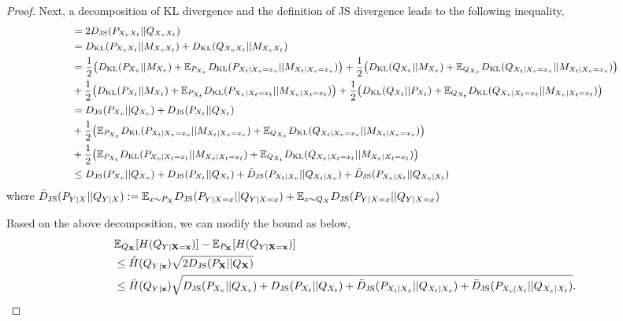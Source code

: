 \begin{proof}
Next, a decomposition of KL divergence and the definition of JS divergence leads to the following inequality,
\begin{equation*}
\small
\begin{split}
&=2 D_{\rm JS}(P_{X_{v}X_{t}}||Q_{X_{v}X_{t}}) \nonumber\\
&= D_{\rm KL}(P_{X_{v}X_{t}}||M_{X_{v}X_{t}}) + D_{\rm KL}(Q_{X_{v}X_{t}}||M_{X_{v}X_{t}}) \nonumber\\
&= \frac{1}{2} \big( D_{\rm KL}(P_{X_{v}}||M_{X_{v}}) + \mathbb{E}_{P_{X_{v}}}D_{\rm KL}(P_{X_{t}|X_{v}=x_{v}} ||M_{X_{t}|X_{v}=x_{v}}) \big) + \frac{1}{2} \big( D_{\rm KL}(Q_{X_{v}}||M_{X_{v}}) + \mathbb{E}_{Q_{X_{v}}}D_{\rm KL}(Q_{X_{t}|X_{v}=x_{v}} ||M_{X_{t}|X_{v}=x_{v}}) \big) \nonumber\\
&+ \frac{1}{2} \big( D_{\rm KL}(P_{X_{t}}||M_{X_{t}}) + \mathbb{E}_{P_{X_{t}}}D_{\rm KL}(P_{X_{v}|X_{t}=x_{t}} ||M_{X_{v}|X_{t}=x_{t}}) \big) + \frac{1}{2} \big( D_{\rm KL}(Q_{X_{t}}||P_{X_{t}}) + \mathbb{E}_{Q_{X_{t}}}D_{\rm KL}(Q_{X_{v}|X_{t}=x_{t}} ||M_{X_{v}|X_{t}=x_{t}}) \big) \nonumber\\
&= D_{\rm JS}(P_{X_{v}}||Q_{X_{v}}) + D_{\rm JS}(P_{X_{t}}||Q_{X_{t}}) \nonumber\\
&+ \frac{1}{2} \big( \mathbb{E}_{P_{X_{v}}}D_{\rm KL}(P_{X_{t}|X_{v}=x_{v}}||M_{X_{t}|X_{v}=x_{v}}) + \mathbb{E}_{Q_{X_{v}}}D_{\rm KL}(Q_{X_{t}|X_{v}=x_{v}}||M_{X_{t}|X_{v}=x_{v}}) \big) \nonumber\\
&+ \frac{1}{2} \big( \mathbb{E}_{P_{X_{t}}}D_{\rm KL}(P_{X_{v}|X_{t}=x_{t}}||M_{X_{v}|X_{t}=x_{t}}) + \mathbb{E}_{Q_{X_{t}}}D_{\rm KL}(Q_{X_{v}|X_{t}=x_{t}}||M_{X_{v}|X_{t}=x_{t}}) \big) \nonumber\\
&\leq D_{\rm JS}(P_{X_{v}}||Q_{X_{v}}) + D_{\rm JS}(P_{X_{t}}||Q_{X_{t}}) + \bar{D}_{\rm JS}(P_{X_{t}|X_{v}}||Q_{X_{t}|X_{v}}) + \bar{D}_{\rm JS}(P_{X_{v}|X_{t}}||Q_{X_{v}|X_{t}})
\end{split}
\end{equation*}
where $\bar{D}_{\rm JS}(P_{Y|X}||Q_{Y|X}):=\mathbb{E}_{x \sim P_{X}} D_{\rm JS}(P_{Y|X=x}||Q_{Y|X=x})+\mathbb{E}_{x \sim Q_{X}} D_{\rm JS}(P_{Y|X=x}||Q_{Y|X=x})$

Based on the above decomposition, we can modify the bound as below,
\begin{equation} \label{thm:x_shift_bound}
\begin{split}
&\mathbb{E}_{Q_{\mathbf{X}}}[H(Q_{Y|\mathbf{X}=\mathbf{x}})] - \mathbb{E}_{P_{\mathbf{X}}}[H(Q_{Y|\mathbf{X}=\mathbf{x}})] \nonumber \\
&\leq \hat{H}(Q_{Y|\mathbf{x}}) \sqrt{2 D_{\rm JS}(P_{\mathbf{X}}||Q_{\mathbf{X}})} \\
&\leq \hat{H}(Q_{Y|\mathbf{x}}) \sqrt{D_{\rm JS}(P_{X_{v}}||Q_{X_{v}})+D_{\rm JS}(P_{X_{t}}||Q_{X_{t}})+ \bar{D}_{\rm JS}(P_{X_{t}|X_{v}}||Q_{X_{t}|X_{v}}) + \bar{D}_{\rm JS}(P_{X_{v}|X_{t}}||Q_{X_{v}|X_{t}}) }.
\end{split}
\end{equation}


\end{proof}
